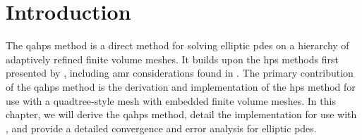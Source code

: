 \section{Introduction}
\label{sec:intro}

The \gls{qahps} method is a direct method for solving elliptic \gls{pdes} on a hierarchy of adaptively refined finite volume meshes. It builds upon the \gls{hps} methods first presented by \citet{gillman2014direct}, including \gls{amr} considerations found in \citep{babb2018accelerated,geldermans2019adaptive}. The primary contribution of the \gls{qahps} method is the derivation and implementation of the \gls{hps} method for use with a quadtree-style mesh with embedded finite volume meshes. In this chapter, we will derive the \gls{qahps} method, detail the implementation for use with \pforest \citep{burstedde2011p4est,burstedde2020parallel}, and provide a detailed convergence and error analysis for elliptic \gls{pdes}.